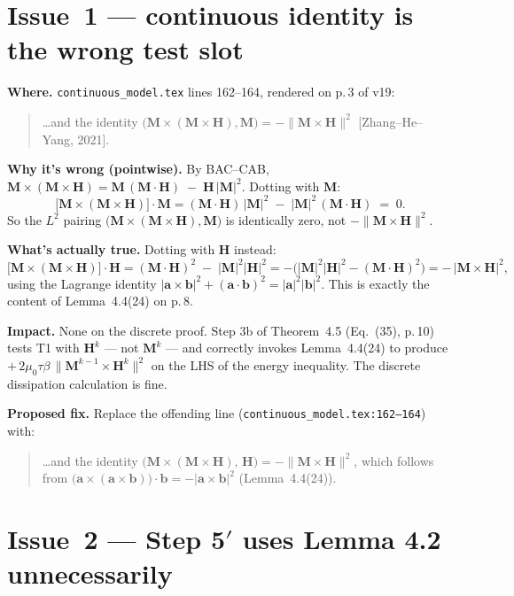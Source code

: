 \documentclass[11pt]{article}
\newcommand{\bM}{\mathbf{M}}
\newcommand{\bH}{\mathbf{H}}
\newcommand{\dt}{\tau}
\begin{document}
\section{Issue~1 --- continuous identity is the wrong test slot}

\textbf{Where.}  \texttt{continuous\_model.tex} lines 162--164,
rendered on p.\,3 of v19:

\begin{quote}
\dots and the identity
$\bigl(\bM\times(\bM\times\bH),\bM\bigr)=-\|\bM\times\bH\|^2$ [Zhang--He--Yang, 2021].
\end{quote}

\textbf{Why it's wrong (pointwise).}  By BAC--CAB,
\(
\bM\times(\bM\times\bH) = \bM\,(\bM\!\cdot\!\bH)\;-\;\bH\,|\bM|^{2}.
\)
Dotting with $\bM$:
\[
\bigl[\bM\times(\bM\times\bH)\bigr]\!\cdot\!\bM
= (\bM\!\cdot\!\bH)\,|\bM|^{2}\;-\;|\bM|^{2}\,(\bM\!\cdot\!\bH)\;=\;0.
\]
So the $L^2$ pairing $\bigl(\bM\times(\bM\times\bH),\bM\bigr)$ is
identically zero, not $-\|\bM\times\bH\|^2$.

\textbf{What's actually true.}  Dotting with $\bH$ instead:
\[
\bigl[\bM\times(\bM\times\bH)\bigr]\!\cdot\!\bH
= (\bM\!\cdot\!\bH)^{2}\;-\;|\bM|^{2}|\bH|^{2}
= -\bigl(|\bM|^{2}|\bH|^{2}-(\bM\!\cdot\!\bH)^{2}\bigr)
= -\,|\bM\times\bH|^{2},
\]
using the Lagrange identity $|\bm{a}\times\bm{b}|^{2}+(\bm{a}\!\cdot\!\bm{b})^{2}
= |\bm{a}|^{2}|\bm{b}|^{2}$.  This is exactly the content of
Lemma~4.4(24) on p.\,8.

\textbf{Impact.}  None on the discrete proof.  Step 3b of
Theorem~4.5 (Eq.~(35), p.\,10) tests T1 with $\bH^{k}$ --- not $\bM^{k}$
--- and correctly invokes Lemma~4.4(24) to produce
$+\,2\mu_{0}\dt\beta\,\|\bM^{k-1}\times\bH^{k}\|^{2}$ on the LHS of the
energy inequality.  The discrete dissipation calculation is fine.

\textbf{Proposed fix.}  Replace the offending line
(\texttt{continuous\_model.tex:162--164}) with:

\begin{quote}
\dots and the identity
$\bigl(\bM\times(\bM\times\bH),\,\bH\bigr)=-\|\bM\times\bH\|^{2}$,
which follows from $\bigl(\bm{a}\times(\bm{a}\times\bm{b})\bigr)\!\cdot\!\bm{b}
= -|\bm{a}\times\bm{b}|^{2}$ (Lemma~4.4(24)).
\end{quote}

\section{Issue~2 --- Step 5$'$ uses Lemma 4.2 unnecessarily}
\end{document}
